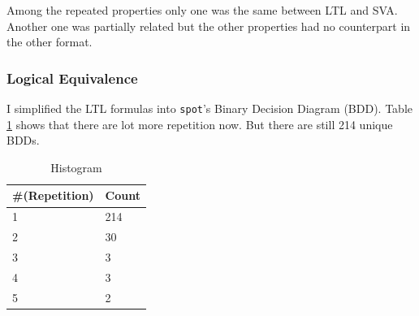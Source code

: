 \documentclass[letterpaper, 12pt]{article}
\begin{document}
Among the repeated properties only one was the same between LTL and SVA. Another
one was partially related but the other properties had no counterpart in the
other format.

\subsubsection{Logical Equivalence}
I simplified the LTL formulas into \texttt{spot}'s Binary Decision Diagram (BDD). Table
\ref{tab:bdd_equiv} shows that there are lot more repetition now. But there are
still 214 unique BDDs.

\begin{table}[H]
\centering
\begin{tabular}{@{}ll@{}}
\toprule
\#(Repetition) & Count \\ \midrule
1              & 214   \\ \midrule
2              & 30    \\ \midrule
3              & 3     \\ \midrule
4              & 3     \\ \midrule
5              & 2     \\ \bottomrule
\end{tabular}
\caption{Histogram}
\label{tab:bdd_equiv}
\end{table}
\end{document}
